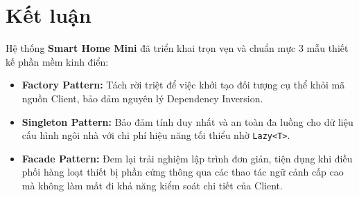 \documentclass[11pt,a4paper]{article}
\begin{document}
\section{Kết luận}
Hệ thống \textbf{Smart Home Mini} đã triển khai trọn vẹn và chuẩn mực 3 mẫu thiết kế phần mềm kinh điển:
\begin{itemize}[itemsep=1.0pt]
    \item \textbf{Factory Pattern:} Tách rời triệt để việc khởi tạo đối tượng cụ thể khỏi mã nguồn Client, bảo đảm nguyên lý Dependency Inversion.
    \item \textbf{Singleton Pattern:} Bảo đảm tính duy nhất và an toàn đa luồng cho dữ liệu cấu hình ngôi nhà với chi phí hiệu năng tối thiểu nhờ \texttt{Lazy<T>}.
    \item \textbf{Facade Pattern:} Đem lại trải nghiệm lập trình đơn giản, tiện dụng khi điều phối hàng loạt thiết bị phần cứng thông qua các thao tác ngữ cảnh cấp cao mà không làm mất đi khả năng kiểm soát chi tiết của Client.
\end{itemize}
\end{document}
